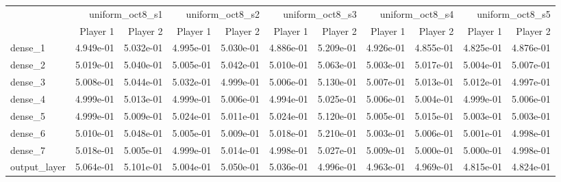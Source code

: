 \begin{tabular}{lrrrrrrrrrr}
\toprule
 & \multicolumn{2}{r}{uniform\_oct8\_s1} & \multicolumn{2}{r}{uniform\_oct8\_s2} & \multicolumn{2}{r}{uniform\_oct8\_s3} & \multicolumn{2}{r}{uniform\_oct8\_s4} & \multicolumn{2}{r}{uniform\_oct8\_s5} \\
 & Player 1 & Player 2 & Player 1 & Player 2 & Player 1 & Player 2 & Player 1 & Player 2 & Player 1 & Player 2 \\
\midrule
dense\_1 & 4.949e-01 & 5.032e-01 & 4.995e-01 & 5.030e-01 & 4.886e-01 & 5.209e-01 & 4.926e-01 & 4.855e-01 & 4.825e-01 & 4.876e-01 \\
dense\_2 & 5.019e-01 & 5.040e-01 & 5.005e-01 & 5.042e-01 & 5.010e-01 & 5.063e-01 & 5.003e-01 & 5.017e-01 & 5.004e-01 & 5.007e-01 \\
dense\_3 & 5.008e-01 & 5.044e-01 & 5.032e-01 & 4.999e-01 & 5.006e-01 & 5.130e-01 & 5.007e-01 & 5.013e-01 & 5.012e-01 & 4.997e-01 \\
dense\_4 & 4.999e-01 & 5.013e-01 & 4.999e-01 & 5.006e-01 & 4.994e-01 & 5.025e-01 & 5.006e-01 & 5.004e-01 & 4.999e-01 & 5.006e-01 \\
dense\_5 & 4.999e-01 & 5.009e-01 & 5.024e-01 & 5.011e-01 & 5.024e-01 & 5.120e-01 & 5.005e-01 & 5.015e-01 & 5.003e-01 & 5.003e-01 \\
dense\_6 & 5.010e-01 & 5.048e-01 & 5.005e-01 & 5.009e-01 & 5.018e-01 & 5.210e-01 & 5.003e-01 & 5.006e-01 & 5.001e-01 & 4.998e-01 \\
dense\_7 & 5.018e-01 & 5.005e-01 & 4.999e-01 & 5.014e-01 & 4.998e-01 & 5.027e-01 & 5.009e-01 & 5.000e-01 & 5.000e-01 & 4.998e-01 \\
output\_layer & 5.064e-01 & 5.101e-01 & 5.004e-01 & 5.050e-01 & 5.036e-01 & 4.996e-01 & 4.963e-01 & 4.969e-01 & 4.815e-01 & 4.824e-01 \\
\bottomrule
\end{tabular}
